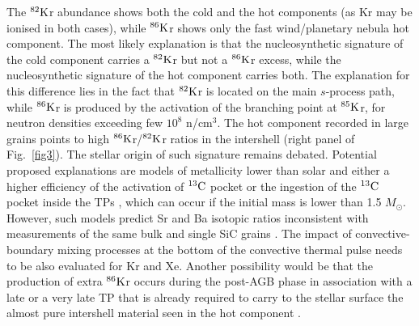 \documentclass{iau}
\newcommand{\iso}[2]{\hbox{${}^{#1}{\rm #2}$}}
\newcommand{\msun}{\ensuremath{{M}_{\odot}}}
\begin{document}
The \iso{82}Kr abundance shows both the cold and the hot components (as
Kr may be ionised in both cases), while \iso{86}Kr shows only the fast wind/planetary 
nebula hot component. 
The most likely explanation is that the nucleosynthetic signature of the cold component 
carries a \iso{82}Kr but not a \iso{86}Kr excess, while the nucleosynthetic signature of 
the hot component carries both. The explanation for this difference lies in the fact that \iso{82}Kr is located on the main $s$-process path, %
while \iso{86}Kr is produced by the activation of the branching point at \iso{85}Kr, for 
neutron densities exceeding few %
$10^8$ n/cm$^3$. %
The hot component recorded in large grains points to high 
\iso{86}Kr/\iso{82}Kr ratios in the intershell (right panel of Fig.~\ref{fig3}). 
The stellar origin of such 
signature remains debated. Potential proposed explanations are models of metallicity lower 
than solar and either a higher efficiency of the activation of \iso{13}C pocket 
\citep{pignatari06} or the ingestion of the \iso{13}C pocket inside the TPs \citep{raut13}, 
which can occur if the initial mass is lower than 1.5 \msun. 
However, such models predict Sr and Ba isotopic ratios inconsistent with
measurements of the same bulk and single SiC grains 
\citep{gallino97,lugaro03b,barzyk07,avila13,liu15}.
The impact of convective-boundary mixing processes at the bottom of 
the convective thermal pulse \citep[e.g.,][]{lugaro03a,battino16} needs to be also 
evaluated for Kr and Xe.  
Another possibility would be that the production 
of extra \iso{86}Kr occurs during the post-AGB phase in 
association with a late or a very late TP
that is already required to carry to the 
stellar surface the almost pure intershell material seen in the hot component
\citep[e.g., as in the case of the
{\em intermediate} neutron-capture process seen in Sakurai's object;][]{herwig11}.
\end{document}
